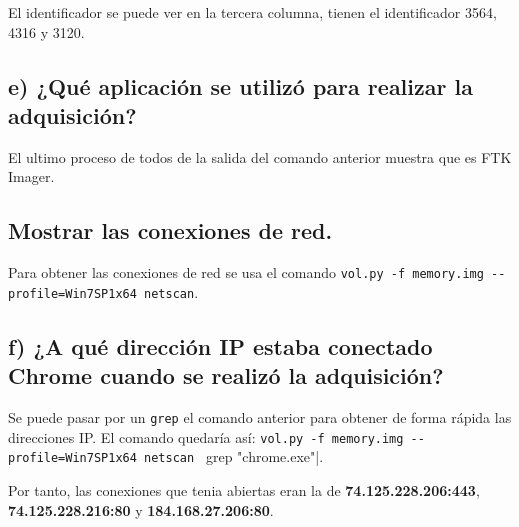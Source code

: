 \documentclass{article}
\begin{document}
El identificador se puede ver en la tercera columna, tienen el identificador 3564, 4316 y 3120.
\subsection{e) ¿Qué aplicación se utilizó para realizar la adquisición?}
El ultimo proceso de todos de la salida del comando anterior muestra que es FTK Imager.

\subsection{Mostrar las conexiones de red.}
Para obtener las conexiones de red se usa el comando \verb|vol.py -f memory.img --profile=Win7SP1x64 netscan|.

\subsection{f) ¿A qué dirección IP estaba conectado Chrome cuando se realizó la adquisición?}

Se puede pasar por un \verb|grep| el comando anterior para obtener de forma rápida las direcciones IP. El comando quedaría así: \verb|vol.py -f memory.img --profile=Win7SP1x64 netscan | grep "chrome.exe"|.


Por tanto, las conexiones que tenia abiertas eran la de \textbf{74.125.228.206:443}, \textbf{74.125.228.216:80} y \textbf{184.168.27.206:80}.
\end{document}
